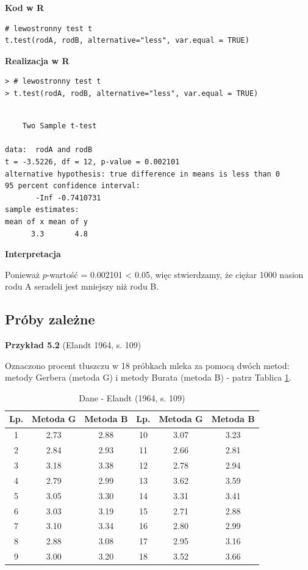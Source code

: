 \documentclass[12pt,B5paper,]{book}
\begin{document}
\vspace{0.8cm} \textbf{Kod w R}

\begin{verbatim}
# lewostronny test t
t.test(rodA, rodB, alternative="less", var.equal = TRUE)
\end{verbatim}

\vspace{0.8cm} \textbf{Realizacja w R}

\begin{verbatim}
> # lewostronny test t
> t.test(rodA, rodB, alternative="less", var.equal = TRUE)
\end{verbatim}

\begin{verbatim}

    Two Sample t-test

data:  rodA and rodB
t = -3.5226, df = 12, p-value = 0.002101
alternative hypothesis: true difference in means is less than 0
95 percent confidence interval:
       -Inf -0.7410731
sample estimates:
mean of x mean of y 
      3.3       4.8 
\end{verbatim}

\vspace{0.8cm} \textbf{Interpretacja}

Ponieważ \(p\)-wartość = 0.002101 \textless{} 0.05, więc stwierdzamy, że
ciężar 1000 nasion rodu A seradeli jest mniejszy niż rodu B.

\subsection{Próby zależne}\label{proby-zalezne}

\vspace{0.8cm} \textbf{Przykład 5.2} (Elandt 1964, s. 109)

Oznaczono procent tłuszczu w 18 próbkach mleka za pomocą dwóch metod:
metody Gerbera (metoda G) i metody Burata (metoda B) - patrz Tablica
\ref{mleko}.

\begin{table}[!ht]
\centering
\caption{Dane - Elandt (1964, s. 109)}
\label{mleko}
\begin{tabular}{ccc|ccc}
\hline
Lp. & Metoda G & Metoda B & Lp. & Metoda G & Metoda B \\ \hline
1   & 2.73     & 2.88     & 10  & 3.07     & 3.23     \\
2   & 2.84     & 2.93     & 11  & 2.66     & 2.81     \\
3   & 3.18     & 3.38     & 12  & 2.78     & 2.94     \\
4   & 2.79     & 2.99     & 13  & 3.62     & 3.59     \\
5   & 3.05     & 3.30     & 14  & 3.31     & 3.41     \\
6   & 3.03     & 3.19     & 15  & 2.71     & 2.88     \\
7   & 3.10     & 3.34     & 16  & 2.80     & 2.99     \\
8   & 2.88     & 3.08     & 17  & 2.95     & 3.16     \\
9   & 3.00     & 3.20     & 18  & 3.52     & 3.66    \\ \hline
\end{tabular}
\end{table}
\end{document}
